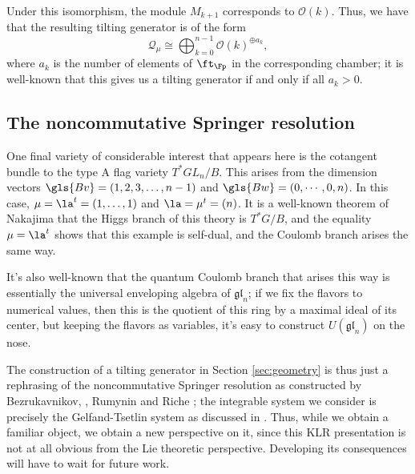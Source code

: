   Under this isomorphism, the module $M_{k+1}$ corresponds to $\mathcal{O}(k)$.
Thus, we have that the resulting tilting generator is of the form \[\mathcal{Q}_{\mu}\cong \bigoplus_{k=0}^{n-1}\mathcal{O}(k)^{\oplus a_k},\] where $a_k$ is the number of elements of $\ft_{\Fp}$ in the corresponding chamber;  it is well-known that this gives us a tilting generator if and only if all $a_k>0$.

\subsection{The noncommutative Springer resolution}
\label{sec:nonc-spring-resol}

One final variety of considerable interest that appears here is the cotangent bundle to the type A flag variety $T^*GL_n/B$.  This arises from the dimension vectors $\gls{Bv}=(1,2,3,\dots, n-1)$ and $\gls{Bw}=(0,\cdots, 0, n)$.  In this case, $\mu=\la^t=(1,\dots, 1)$ and $\la=\mu^t=(n)$.   It is a well-known theorem of Nakajima that the Higgs branch of this theory is $T^*G/B$, and the equality $\mu=\la^t$ shows that this example is self-dual, and the Coulomb branch arises the same way.

It's also well-known that the quantum Coulomb branch that arises this way is essentially the universal enveloping algebra of $\mathfrak{gl}_n$; if we fix the flavors to numerical values, then this is the quotient of this ring by a maximal ideal of its center, but keeping the flavors as variables, it's easy to construct $U(\mathfrak{gl}_n)$ on the nose.

The construction of a tilting generator in Section \ref{sec:geometry} is thus just a rephrasing of the noncommutative Springer resolution as constructed by Bezrukavnikov, \Mirkovic, Rumynin and Riche \cite{BMRR, BezNon}; the integrable system we consider is precisely the Gelfand-Tsetlin system as discussed in \cite{WWY}.  Thus, while we obtain a familiar object, we obtain a new perspective on it, since this KLR presentation is not at all obvious from the Lie theoretic perspective.  Developing its consequences will have to wait for future work.


